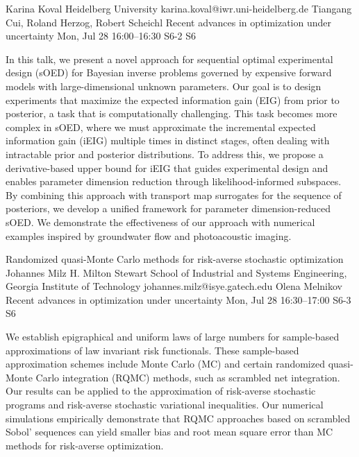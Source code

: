 \begin{talk}
  {Karina Koval}%
  {Heidelberg University}%
  {karina.koval@iwr.uni-heidelberg.de}%
  {Tiangang Cui, Roland Herzog, Robert Scheichl}%
  {Recent advances in optimization under uncertainty}%
  {}%
  {Mon, Jul 28 16:00--16:30}%
  {S6-2}%
  {S6}%
    
   
In this talk, we present a novel approach for sequential optimal experimental design (sOED) for Bayesian inverse problems governed by expensive forward models with large-dimensional unknown parameters. Our goal is to design experiments that maximize the expected information gain (EIG) from prior to posterior, a task that is computationally challenging. This task becomes more complex in sOED, where we must approximate the incremental expected information gain (iEIG) multiple times in distinct stages, often dealing with intractable prior and posterior distributions. To address this, we propose a derivative-based upper bound for iEIG that guides experimental design and enables parameter dimension reduction through likelihood-informed subspaces. By combining this approach with transport map surrogates for the sequence of posteriors, we develop a unified framework for parameter dimension-reduced sOED. We demonstrate the effectiveness of our approach with numerical examples inspired by groundwater flow and photoacoustic imaging.
\end{talk}

\begin{talk}
  {Randomized quasi-Monte Carlo methods for risk-averse stochastic optimization}%
  {Johannes Milz}%
  {H. Milton Stewart School of Industrial and Systems Engineering, Georgia Institute of Technology}%
  {johannes.milz@isye.gatech.edu}%
  {Olena Melnikov}%
  {Recent advances in optimization under uncertainty}%
  {Mon, Jul 28 16:30--17:00}%
  {S6-3}%
  {S6}%
    

We establish epigraphical and uniform laws of large numbers for sample-based approximations of law invariant risk functionals. These sample-based approximation schemes include Monte Carlo (MC) and certain randomized quasi-Monte Carlo integration (RQMC) methods, such as scrambled net integration. Our results can be applied to the approximation of risk-averse stochastic programs and risk-averse stochastic variational inequalities. Our numerical simulations empirically demonstrate that RQMC approaches based on scrambled Sobol' sequences can yield smaller bias and root mean square error than MC methods for risk-averse optimization.




\end{talk}

